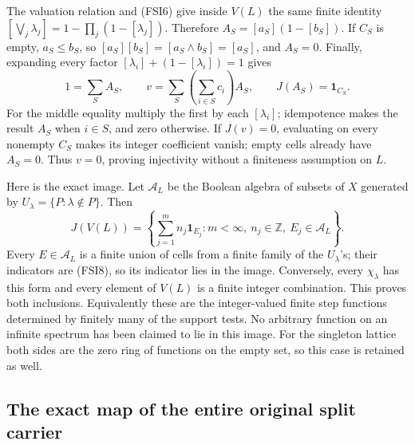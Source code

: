 The valuation relation and (FSI6) give inside \(V(L)\) the same
finite identity
\([\bigvee_j\lambda_j]=1-\prod_j(1-[\lambda_j])\).
Therefore
\(A_S=[a_S](1-[b_S])\).
If \(C_S\) is empty, \(a_S\le b_S\), so
\([a_S][b_S]=[a_S\wedge b_S]=[a_S]\), and \(A_S=0\).
Finally, expanding every factor \([\lambda_i]+(1-[\lambda_i])=1\)
gives
\begin{equation}\tag{FSI9}
1=\sum_S A_S,\qquad
v=\sum_S\left(\sum_{i\in S}c_i\right)A_S,\qquad
J(A_S)=\mathbf1_{C_S}.
\end{equation}
For the middle equality multiply the first by each \([\lambda_i]\);
idempotence makes the result \(A_S\) when \(i\in S\), and zero
otherwise. If \(J(v)=0\), evaluating on every nonempty \(C_S\)
makes its integer coefficient vanish; empty cells already have
\(A_S=0\). Thus \(v=0\), proving injectivity without a finiteness
assumption on \(L\).

Here is the exact image. Let \(\mathcal A_L\) be the Boolean algebra
of subsets of \(X\) generated by
\(U_\lambda=\{P:\lambda\notin P\}\).
Then
\begin{equation}\tag{FSI10}
J(V(L))=
\left\{\sum_{j=1}^m n_j\mathbf1_{E_j}:
m<\infty,\ n_j\in\mathbb Z,\ E_j\in\mathcal A_L\right\}.
\end{equation}
Every \(E\in\mathcal A_L\) is a finite union of cells from a finite
family of the \(U_\lambda\)'s; their indicators are (FSI8), so its
indicator lies in the image. Conversely, every \(\chi_\lambda\)
has this form and every element of \(V(L)\) is a finite integer
combination. This proves both inclusions. Equivalently these are
the integer-valued finite step functions determined by finitely many
of the support tests. No arbitrary function on an infinite
spectrum has been claimed to lie in this image.
For the singleton lattice both sides are the zero ring of functions
on the empty set, so this case is retained as well.

\subsection{The exact map of the entire original split carrier}

